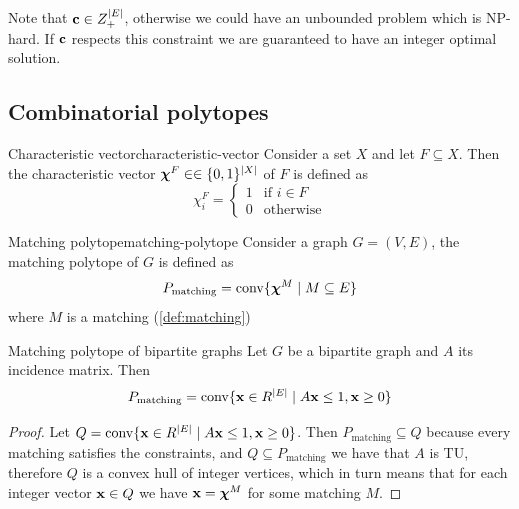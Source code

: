 \documentclass[12pt]{extarticle}
\renewcommand{\vec}[1]{\bvec{#1}}
\begin{document}
Note that $\vec c \in Z^\abs{E}_+$, otherwise we could have an unbounded problem which is NP-hard.
If $\vec c$ respects this constraint we are guaranteed to have an integer optimal solution.

\subsection{Combinatorial polytopes}

\begin{definition}{Characteristic vector}{characteristic-vector}
	Consider a set $X$ and let $F \subseteq X$.
	Then the characteristic vector $\vec \chi^F \in \in \{0, 1\}^\abs{X}$ of $F$ is defined as
	\begin{equation}
		\chi^F_i = \begin{cases}
			1 & \text{if } i \in F \\
			0 & \text{otherwise}
		\end{cases}
	\end{equation}
\end{definition}

\begin{definition}{Matching polytope}{matching-polytope}
	Consider a graph $G = (V, E)$, the matching polytope of $G$ is defined as
	\begin{equation}
		P_\text{matching} = \mathrm{conv}\{ \vec \chi^M \mid M \subseteq E\}
	\end{equation}
	where $M$ is a matching (\cref{def:matching})
\end{definition}

\begin{lemma}{Matching polytope of bipartite graphs}{}
	Let $G$ be a bipartite graph and $A$ its incidence matrix. Then
	\begin{equation}
		P_\text{matching} = \mathrm{conv}\{ \vec x \in R^\abs{E} \mid A \vec x \leq 1, \vec x \geq 0\}
	\end{equation}
\end{lemma}

\begin{proof}
	Let $Q = \mathrm{conv}\{ \vec x \in R^\abs{E} \mid A \vec x \leq 1, \vec x \geq 0\}$.
	Then $P_\text{matching} \subseteq Q$ because every matching satisfies the constraints, and
	$Q \subseteq P_\text{matching}$ we have that $A$ is TU, therefore $Q$ is a convex hull of integer
	vertices, which in turn means that for each integer vector $\vec x \in Q$ we have
	$\vec x = \vec \chi^M$ for some matching $M$.
\end{proof}
\end{document}
